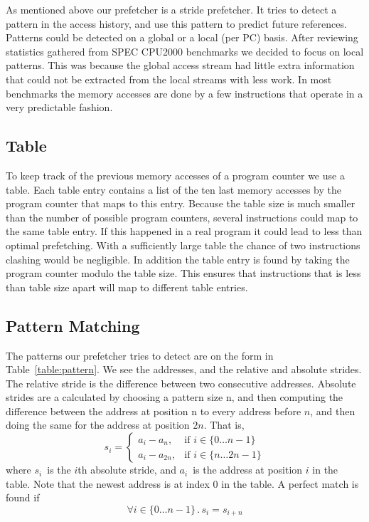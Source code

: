 As mentioned above our prefetcher is a stride prefetcher. It tries to detect a
pattern in the access history, and use this pattern to predict future
references. Patterns could be detected on a global or a local (per PC) basis.
After reviewing statistics gathered from SPEC CPU2000 benchmarks we decided to
focus on local patterns. This was because the global access stream had little
extra information that could not be extracted from the local streams with less
work. In most benchmarks the memory accesses are done by a few instructions
that operate in a very predictable fashion.

\subsection{Table}

To keep track of the previous memory accesses of a program counter we use a
table. Each table entry contains a list of the ten last memory accesses by the
program counter that maps to this entry. Because the table size is much smaller
than the number of possible program counters, several instructions could map to
the same table entry. If this happened in a real program it could lead to less
than optimal prefetching. With a sufficiently large table the chance of two
instructions clashing would be negligible. In addition the table entry is found
by taking the program counter modulo the table size. This ensures that
instructions that is less than table size apart will map to different table
entries.

\subsection{Pattern Matching}

The patterns our prefetcher tries to detect are on the form in
Table~\ref{table:pattern}.
We see the addresses, and the relative and absolute strides.
The relative stride is the difference between two consecutive
addresses.
Absolute strides are a calculated by choosing a pattern size n,
and then computing the difference between the address at position
n to every address before $n$, and then doing the same for the address
at position $2n$.
That is,
\[
	s_i = \begin{cases}
		a_i - a_n,    & \text{if } i \in \{0 \dots n -1\}\\
		a_i - a_{2n}, & \text{if } i \in \{n \dots 2n - 1\}
	\end{cases}
\]
where $s_i$~is the $i$th absolute stride, and $a_i$~is the address at position
$i$ in the table. Note that the newest address is at index 0 in the table. A
perfect match is found if
\begin{equation}
\label{eq:match}
\forall i \in \{0 \dots n - 1\} \,.\, s_i = s_{i + n}
\end{equation}


